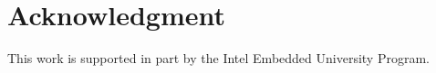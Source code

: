 \section{Acknowledgment}
\label{sec_ack}

This work is supported in part by the Intel Embedded University Program.
